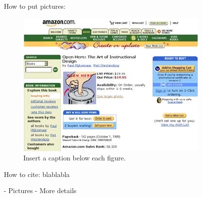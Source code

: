 How to put pictures:

\begin{figure}
  \centering
  \includegraphics[width=\linewidth]{sample.jpg}
  \caption{Insert a caption below each figure.}
  \label{fig:sample}
\end{figure}

How to cite:
blablabla~\cite{acm_categories}

\TODO
- Pictures \newline
- More details
